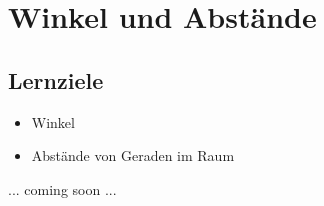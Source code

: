 \section{Winkel und Abstände}

\subsection*{Lernziele}
\begin{itemize}
\item Winkel 
\item Abstände von Geraden im Raum
\end{itemize}


... coming soon ...
